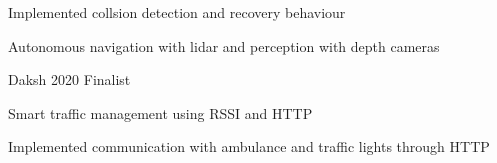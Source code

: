 \begin{cventries}
{\begin{cvitems}
			\item {Implemented collsion detection and recovery behaviour}
			\item {Autonomous navigation with lidar and perception with depth cameras}
		\end{cvitems}
	}
	\cventry
	{} %
	{Daksh 2020} %
	{Finalist} %
	{} %
	{
		\begin{cvitems} %
			\item {Smart traffic management using RSSI and HTTP}
			\item {Implemented communication with ambulance and traffic lights through HTTP}
		\end{cvitems}
	}
\end{cventries}
